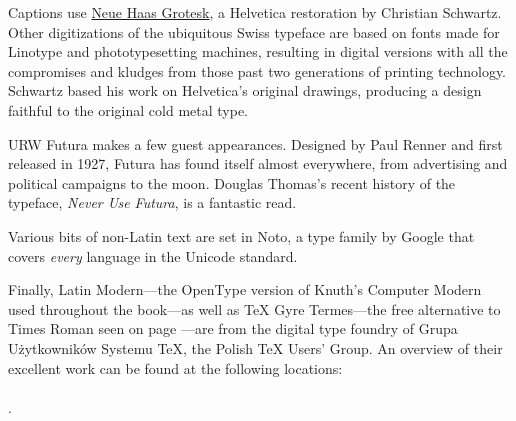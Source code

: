 Captions use
\href{http://www.fontbureau.com/NHG/}{\textsf{\small Neue Haas Grotesk}},
a Helvetica restoration by Christian Schwartz.
Other digitizations of the ubiquitous Swiss typeface are based on fonts made for
Linotype and phototypesetting machines,
resulting in digital versions with all the compromises and kludges from those
past two generations of printing technology.
Schwartz based his work on Helvetica's original drawings,
producing a design faithful to the original cold metal type.

{URW Futura}
makes a few guest appearances.
Designed by Paul Renner and first released in 1927,
Futura has found itself almost everywhere,
from advertising and political campaigns to the moon.
Douglas Thomas's recent history of the typeface,
\textit{Never Use Futura}, is a fantastic read.

Various bits of non-Latin text are set in
{Noto},
a type family by Google that covers \emph{every} language
in the Unicode standard.

Finally,
{\lm Latin Modern}---the OpenType version of Knuth's Computer Modern used throughout
the book---as well
as {\TeX{} Gyre Termes}---the
free alternative to Times Roman seen on page \pageref{typography}---are from
the digital type foundry of Grupa Użytkowników Systemu \TeX{},
the Polish \TeX{} Users' Group.
An overview of their excellent work can be found at the following locations:\\
 \\
.
